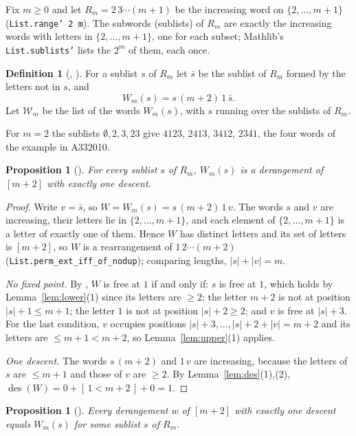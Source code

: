 \documentclass[11pt]{amsart}
\theoremstyle{plain}
\newtheorem{proposition}[theorem]{Proposition}
\theoremstyle{definition}
\newtheorem{definition}[theorem]{Definition}
\newcommand{\des}{\operatorname{des}}
\begin{document}
Fix $m\ge0$ and let $R_m=2\,3\cdots(m+1)$ be the increasing word on $\{2,\dots,m+1\}$ (\texttt{List.range' 2 m}). The subwords (sublists) of $R_m$ are exactly the increasing words with letters in $\{2,\dots,m+1\}$, one for each subset; Mathlib's \texttt{List.sublists'} lists the $2^m$ of them, each once.

\begin{definition}[, ]\label{def:word}
For a sublist $s$ of $R_m$ let $\bar s$ be the sublist of $R_m$ formed by the letters not in $s$, and
\[
  W_m(s)=s\,(m+2)\,1\,\bar s .
\]
Let $\mathcal W_m$ be the list of the words $W_m(s)$, with $s$ running over the sublists of $R_m$.
\end{definition}

For $m=2$ the sublists $\emptyset,2,3,23$ give $4123$, $2413$, $3412$, $2341$, the four words of the example in A332010.

\begin{proposition}[]\label{prop:words}
For every sublist $s$ of $R_m$, $W_m(s)$ is a derangement of $[m+2]$ with exactly one descent.
\end{proposition}

\begin{proof}
Write $v=\bar s$, so $W=W_m(s)=s\,(m+2)\,1\,v$. The words $s$ and $v$ are increasing, their letters lie in $\{2,\dots,m+1\}$, and each element of $\{2,\dots,m+1\}$ is a letter of exactly one of them. Hence $W$ has distinct letters and its set of letters is $[m+2]$, so $W$ is a rearrangement of $1\,2\cdots(m+2)$ (\texttt{List.perm\_ext\_iff\_of\_nodup}); comparing lengths, $|s|+|v|=m$.

\emph{No fixed point.} By , $W$ is free at $1$ if and only if: $s$ is free at $1$, which holds by Lemma~\ref{lem:lower}(1) since its letters are $\ge2$; the letter $m+2$ is not at position $|s|+1\le m+1$; the letter $1$ is not at position $|s|+2\ge2$; and $v$ is free at $|s|+3$. For the last condition, $v$ occupies positions $|s|+3,\dots,|s|+2+|v|=m+2$ and its letters are $\le m+1<m+2$, so Lemma~\ref{lem:upper}(1) applies.

\emph{One descent.} The words $s\,(m+2)$ and $1\,v$ are increasing, because the letters of $s$ are $\le m+1$ and those of $v$ are $\ge2$. By Lemma~\ref{lem:des}(1),(2), $\des(W)=0+[\,1<m+2\,]+0=1$.
\end{proof}

\begin{proposition}[]\label{prop:converse}
Every derangement $w$ of $[m+2]$ with exactly one descent equals $W_m(s)$ for some sublist $s$ of $R_m$.
\end{proposition}
\end{document}
